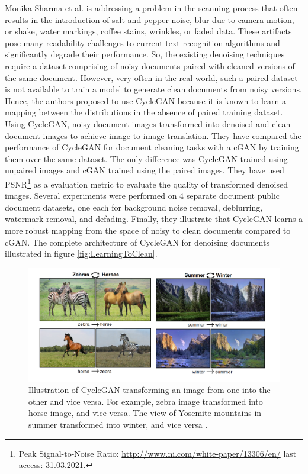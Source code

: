 Monika Sharma et al.\cite{sharma2019learning} is addressing a problem in the scanning process that often results in the introduction of salt and pepper noise, blur due to camera motion, or shake, water markings, coffee stains, wrinkles, or faded data. These artifacts pose many readability challenges to current text recognition algorithms and significantly degrade their performance. So, the existing denoising techniques require a dataset comprising of noisy documents paired with cleaned versions of the same document. However, very often in the real world, such a paired dataset is not available to train a model to generate clean documents from noisy versions. Hence, the authors proposed to use \ac{CycleGAN} because it is known to learn a mapping between the distributions in the absence of paired training dataset. Using \ac{CycleGAN}, noisy document images transformed into denoised and clean document images to achieve image-to-image translation. They have compared the performance of \ac{CycleGAN} for document cleaning tasks with a \ac{cGAN} by training them over the same dataset. The only difference was \ac{CycleGAN} trained using unpaired images and \ac{cGAN} trained using the paired images. They have used \ac{PSNR}\footnote{Peak Signal-to-Noise Ratio: \url{http://www.ni.com/white-paper/13306/en/} last access: 31.03.2021.} as a evaluation metric to evaluate the quality of transformed denoised images. Several experiments were performed on 4 separate document public document datasets, one each for background noise removal, deblurring, watermark removal, and defading. Finally, they illustrate that \ac{CycleGAN} learns a more robust mapping from the space of noisy to clean documents compared to \ac{cGAN}. The complete architecture of \ac{CycleGAN} for denoising documents illustrated in figure \ref{fig:LearningToClean}.


\begin{figure}[H]
        \begin{center}
 	    \includegraphics[scale=0.35]{images/CycleGANExamples.png}
	    \caption[Illustration of \ac{CycleGAN} transforming an image from one into the other and vice versa.]{Illustration of \ac{CycleGAN} transforming an image from one into the other and vice versa. For example, zebra image transformed into horse image, and vice versa. The view of Yosemite mountains in summer transformed into winter, and vice versa \cite{zhu2020unpaired}.}
	    \label{fig:CycleganExamples}
	    \end{center}
\end{figure}



